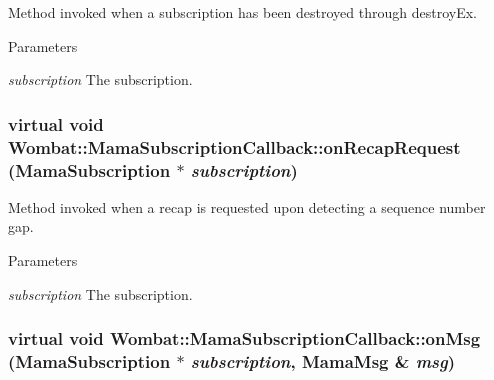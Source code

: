 Method invoked when a subscription has been destroyed through destroyEx. 
\begin{DoxyParams}{Parameters}
\item[{\em subscription}]The subscription. \end{DoxyParams}
\hypertarget{classWombat_1_1MamaSubscriptionCallback_a78cb77e1859e1b7b56dcfad135000fe3}{
\subsubsection[{onRecapRequest}]{\setlength{\rightskip}{0pt plus 5cm}virtual void Wombat::MamaSubscriptionCallback::onRecapRequest ({\bf MamaSubscription} $\ast$ {\em subscription})}}
\label{classWombat_1_1MamaSubscriptionCallback_a78cb77e1859e1b7b56dcfad135000fe3}


Method invoked when a recap is requested upon detecting a sequence number gap. 
\begin{DoxyParams}{Parameters}
\item[{\em subscription}]The subscription. \end{DoxyParams}
\hypertarget{classWombat_1_1MamaSubscriptionCallback_ab269bb4f32930dc167b7e0f0f3b188a2}{
\subsubsection[{onMsg}]{\setlength{\rightskip}{0pt plus 5cm}virtual void Wombat::MamaSubscriptionCallback::onMsg ({\bf MamaSubscription} $\ast$ {\em subscription}, \/  {\bf MamaMsg} \& {\em msg})}}
\label{classWombat_1_1MamaSubscriptionCallback_ab269bb4f32930dc167b7e0f0f3b188a2}


